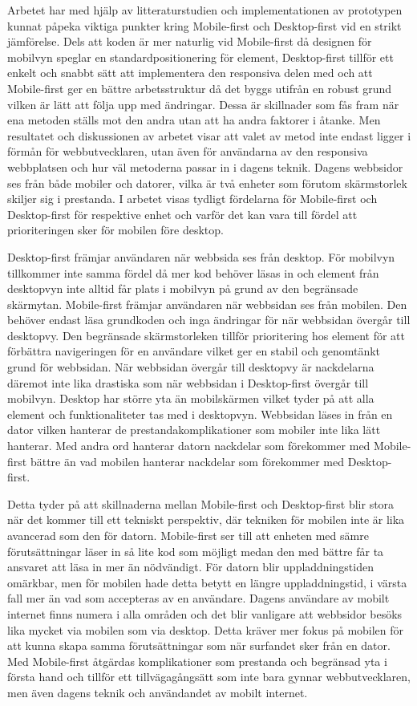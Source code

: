 \documentclass[11pt]{article}
\begin{document}
Arbetet har med hjälp av litteraturstudien och implementationen av prototypen kunnat påpeka viktiga punkter kring Mobile-first och Desktop-first vid en strikt jämförelse. Dels att koden är mer naturlig vid Mobile-first då designen för mobilvyn speglar en standardpositionering för element, Desktop-first tillför ett enkelt och snabbt sätt att implementera den responsiva delen med och att Mobile-first ger en bättre arbetsstruktur då det byggs utifrån en robust grund vilken är lätt att följa upp med ändringar. Dessa är skillnader som fås fram när ena metoden ställs mot den andra utan att ha andra faktorer i åtanke. Men resultatet och diskussionen av arbetet visar att valet av metod inte endast ligger i förmån för webbutvecklaren, utan även för användarna av den responsiva webbplatsen och hur väl metoderna passar in i dagens teknik. Dagens webbsidor ses från både mobiler och datorer, vilka är två enheter som förutom skärmstorlek skiljer sig i prestanda. I arbetet visas tydligt fördelarna för Mobile-first och Desktop-first för respektive enhet och varför det kan vara till fördel att prioriteringen sker för mobilen före desktop.

Desktop-first främjar användaren när webbsida ses från desktop. För mobilvyn tillkommer inte samma fördel då mer kod behöver läsas in och element från desktopvyn inte alltid får plats i mobilvyn på grund av den begränsade skärmytan. Mobile-first främjar användaren när webbsidan ses från mobilen. Den behöver endast läsa grundkoden och inga ändringar för när webbsidan övergår till desktopvy. Den begränsade skärmstorleken tillför prioritering hos element för att förbättra navigeringen för en användare vilket ger en stabil och genomtänkt grund för webbsidan. När webbsidan övergår till desktopvy är nackdelarna däremot inte lika drastiska som när webbsidan i Desktop-first övergår till mobilvyn. Desktop har större yta än mobilskärmen vilket tyder på att alla element och funktionaliteter tas med i desktopvyn. Webbsidan läses in från en dator vilken hanterar de prestandakomplikationer som mobiler inte lika lätt hanterar. Med andra ord hanterar datorn nackdelar som förekommer med Mobile-first bättre än vad mobilen hanterar nackdelar som förekommer med Desktop-first.

Detta tyder på att skillnaderna mellan Mobile-first och Desktop-first blir stora när det kommer till ett tekniskt perspektiv, där tekniken för mobilen inte är lika avancerad som den för datorn.  Mobile-first ser till att enheten med sämre förutsättningar läser in så lite kod som möjligt medan den med bättre får ta ansvaret att läsa in mer än nödvändigt. För datorn blir uppladdningstiden omärkbar, men för mobilen hade detta betytt en längre uppladdningstid, i värsta fall mer än vad som accepteras av en användare. Dagens användare av mobilt internet finns numera i alla områden och det blir vanligare att webbsidor besöks lika mycket via mobilen som via desktop. Detta kräver mer fokus på mobilen för att kunna skapa samma förutsättningar som när surfandet sker från en dator. Med Mobile-first åtgärdas komplikationer som prestanda och begränsad yta i första hand och tillför ett tillvägagångsätt som inte bara gynnar webbutvecklaren, men även dagens teknik och användandet av mobilt internet.
\end{document}
